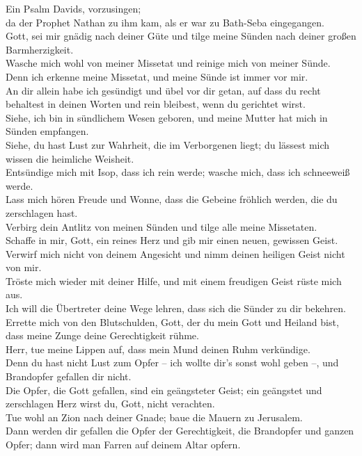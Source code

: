  Ein Psalm Davids, vorzusingen;\\
 da der Prophet Nathan zu ihm kam, als er war zu Bath-Seba
eingegangen.\\
 Gott, sei mir gnädig nach deiner Güte und tilge meine
Sünden nach deiner großen Barmherzigkeit.\\
 Wasche mich wohl von meiner Missetat und reinige mich von
meiner Sünde.\\
 Denn ich erkenne meine Missetat, und meine Sünde ist
immer vor mir.\\
 An dir allein habe ich gesündigt und übel vor dir getan,
auf dass du recht behaltest in deinen Worten und rein bleibest, wenn du
gerichtet wirst.\\
 Siehe, ich bin in sündlichem Wesen geboren, und meine
Mutter hat mich in Sünden empfangen.\\
 Siehe, du hast Lust zur Wahrheit, die im Verborgenen
liegt; du lässest mich wissen die heimliche Weisheit.\\
 Entsündige mich mit Isop, dass ich rein werde; wasche
mich, dass ich schneeweiß werde.\\
 Lass mich hören Freude und Wonne, dass die Gebeine
fröhlich werden, die du zerschlagen hast.\\
 Verbirg dein Antlitz von meinen Sünden und tilge alle
meine Missetaten.\\
 Schaffe in mir, Gott, ein reines Herz und gib mir einen
neuen, gewissen Geist.\\
 Verwirf mich nicht von deinem Angesicht und nimm deinen
heiligen Geist nicht von mir.\\
 Tröste mich wieder mit deiner Hilfe, und mit einem
freudigen Geist rüste mich aus.\\
 Ich will die Übertreter deine Wege lehren, dass sich die
Sünder zu dir bekehren.\\
 Errette mich von den Blutschulden, Gott, der du mein
Gott und Heiland bist, dass meine Zunge deine Gerechtigkeit rühme.\\
 Herr, tue meine Lippen auf, dass mein Mund deinen Ruhm
verkündige.\\
 Denn du hast nicht Lust zum Opfer -- ich wollte dir's
sonst wohl geben --, und Brandopfer gefallen dir nicht.\\
 Die Opfer, die Gott gefallen, sind ein geängsteter
Geist; ein geängstet und zerschlagen Herz wirst du, Gott, nicht
verachten.\\
 Tue wohl an Zion nach deiner Gnade; baue die Mauern zu
Jerusalem.\\
 Dann werden dir gefallen die Opfer der Gerechtigkeit,
die Brandopfer und ganzen Opfer; dann wird man Farren auf deinem Altar
opfern.

